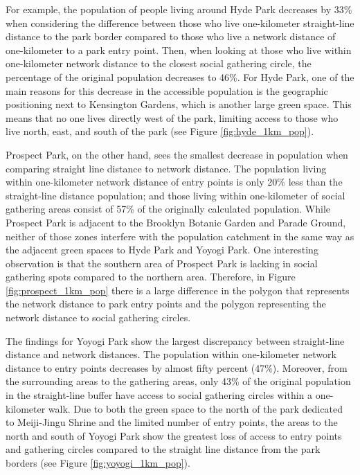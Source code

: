 \begin{multicols}{2}
For example, the population of people living around Hyde Park decreases by 33\% when considering the difference between those who live one-kilometer straight-line distance to the park border compared to those who live a network distance of one-kilometer to a park entry point. Then, when looking at those who live within one-kilometer network distance to the closest social gathering circle, the percentage of the original population decreases to 46\%. For Hyde Park, one of the main reasons for this decrease in the accessible population is the geographic positioning next to Kensington Gardens, which is another large green space. This means that no one lives directly west of the park, limiting access to those who live north, east, and south of the park (see Figure \ref{fig:hyde_1km_pop}). 

Prospect Park, on the other hand, sees the smallest decrease in population when comparing straight line distance to network distance. The population living within one-kilometer network distance of entry points is only 20\% less than the straight-line distance population; and those living within one-kilometer of social gathering areas consist of 57\% of the originally calculated population. While Prospect Park is adjacent to the Brooklyn Botanic Garden and Parade Ground, neither of those zones interfere with the population catchment in the same way as the adjacent green spaces to Hyde Park and Yoyogi Park. One interesting observation is that the southern area of Prospect Park is lacking in social gathering spots compared to the northern area. Therefore, in Figure \ref{fig:prospect_1km_pop} there is a large difference in the polygon that represents the network distance to park entry points and the polygon representing the network distance to social gathering circles. 

The findings for Yoyogi Park show the largest discrepancy between straight-line distance and network distances. The population within one-kilometer network distance to entry points decreases by almost fifty percent (47\%). Moreover, from the surrounding areas to the gathering areas, only 43\% of the original population in the straight-line buffer have access to social gathering circles within a one-kilometer walk. Due to both the green space to the north of the park dedicated to Meiji-Jingu Shrine and the limited number of entry points, the areas to the north and south of Yoyogi Park show the greatest loss of access to entry points and gathering circles compared to the straight line distance from the park borders (see Figure \ref{fig:yoyogi_1km_pop}).


\end{multicols}
